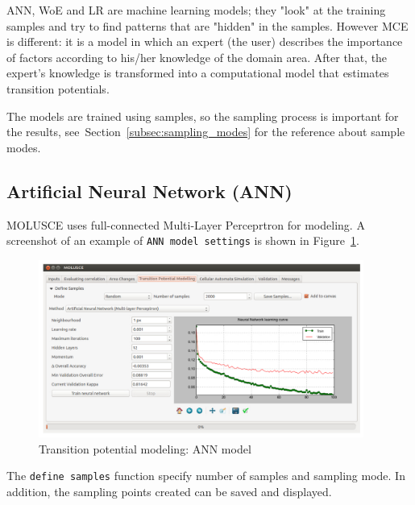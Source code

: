 \documentclass{report}
\begin{document}
ANN, WoE and LR are machine learning models; they "look" at the training samples and try 
to find patterns that are "hidden" in the samples. However MCE is different: 
it is a model in which an expert (the user) describes the importance of factors
according to his/her knowledge of the domain area. After that, the expert's knowledge is transformed into
a computational model that estimates transition potentials.

The models are trained using samples, so the sampling process is important for the results, see~Section~\ref{subsec:sampling_modes} for the reference about sample modes.


\subsection{Artificial Neural Network (ANN)}
MOLUSCE uses full-connected Multi-Layer Perceprtron for modeling.
A screenshot of an example of \verb+ANN model settings+ is shown in Figure~\ref{fig:ann_model}.

\begin{figure}[h!]
\centering
\includegraphics[width=0.95\textwidth]{img/ann_model.png}
\caption{Transition potential modeling: ANN model}
\label{fig:ann_model}
\end{figure}

The \verb+define samples+ function specify number of samples and sampling mode. In addition, the
sampling points created can be saved and displayed.
\end{document}
